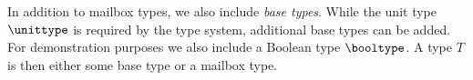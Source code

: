 In addition to mailbox types, we also include \emph{base types}.
While the unit type $\unittype$ is required by the type system, additional base types can be added.
For demonstration purposes we also include a Boolean type $\booltype$.
A type $T$ is then either some base type or a mailbox type.



